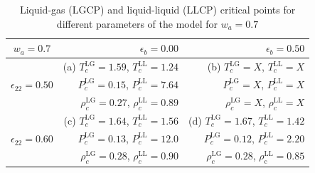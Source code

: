 \documentclass[9pt,twocolumn,twoside,lineno]{pnas-new}
\begin{document}
\begin{table}
\caption{Liquid-gas (LGCP) and liquid-liquid (LLCP) critical points for different parameters of the model for $w_a=0.7$}


\centering
\begin{tabular}{ |c||r|r|} 
 \hline
    $w_a=0.7$ & $\epsilon_b=0.00$ & $\epsilon_b=0.50$  \\ 
  \hline
  \hline
 \multirow{3}{4em}{$\epsilon_{22}=0.50$} &   (a) $T_c^\text{LG}=1.59$,  $T_c^\text{LL}=1.24$  &   (b) $T_c^\text{LG}=X$, $T_c^\text{LL}=X$ \\
 &  $P_c^\text{LG}=0.15$, $P_c^\text{LL}=7.64$ & $P_c^\text{LG}=X$, $P_c^\text{LL}=X$  \\
 & $\rho_c^\text{LG}=0.27$, $\rho_c^\text{LL}=0.89$ & $\rho_c^\text{LG}=X$, $\rho_c^\text{LL}=X$ \\
 \hline
 
  \multirow{3}{4em}{$\epsilon_{22}=0.60$} &   (c) $T_c^\text{LG}=1.64$, $T_c^\text{LL}=1.56$ &  (d) $T_c^\text{LG}=1.67$, $T_c^\text{LL}=1.42$  \\ 
  & $P_c^\text{LG}=0.13$, $P_c^\text{LL}=12.0$ & $P_c^\text{LG}=0.12$, $P_c^\text{LL}=2.20$ \\ 
  & $\rho_c^\text{LG}=0.28$, $\rho_c^\text{LL}=0.90$ & $\rho_c^\text{LG}=0.28$, $\rho_\text{c}^\text{LL}=0.85$ \\ 
 \hline 
 

\end{tabular}
\label{Table2}
\end{table}
\end{document}
